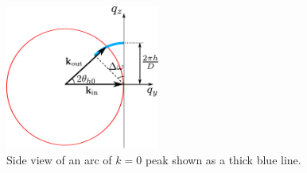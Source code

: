 \begin{figure}[htbp]
  \centering
  \includegraphics[width=0.45\textwidth]{figures/ripple/analysis/ewald_main}
  \caption{Side view of an arc of $k=0$ peak shown as a thick blue line.}
  \label{fig:ewald_main}
\end{figure}

